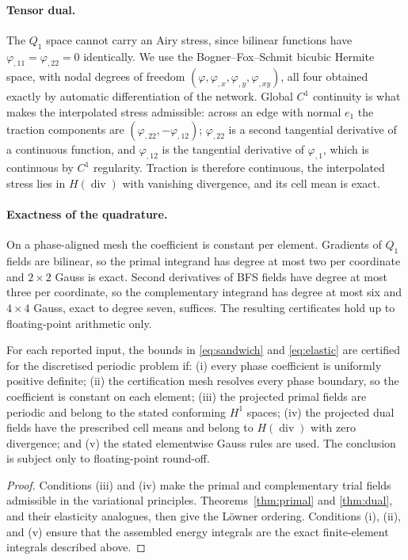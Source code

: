\paragraph{Tensor dual.} The $Q_1$ space cannot carry an Airy stress, since
bilinear functions have $\varphi_{,11} = \varphi_{,22} = 0$ identically. We
use the Bogner--Fox--Schmit bicubic Hermite space, with nodal degrees of
freedom $(\varphi, \varphi_{,x}, \varphi_{,y}, \varphi_{,xy})$, all four
obtained exactly by automatic differentiation of the network. Global $C^1$
continuity is what makes the interpolated stress admissible: across an edge
with normal $e_1$ the traction components are
$(\varphi_{,22}, -\varphi_{,12})$; $\varphi_{,22}$ is a second tangential
derivative of a continuous function, and $\varphi_{,12}$ is the tangential
derivative of $\varphi_{,1}$, which is continuous by $C^1$ regularity.
Traction is therefore continuous, the interpolated stress lies in
$H(\operatorname{div})$ with vanishing divergence, and its cell mean is
exact.

\paragraph{Exactness of the quadrature.} On a phase-aligned mesh the
coefficient is constant per element. Gradients of $Q_1$ fields are
bilinear, so the primal integrand has degree at most two per coordinate and
$2\times 2$ Gauss is exact. Second derivatives of BFS fields have degree at
most three per coordinate, so the complementary integrand has degree at
most six and $4 \times 4$ Gauss, exact to degree seven, suffices. The
resulting certificates hold up to floating-point arithmetic only.

\begin{proposition}
\label{prop:contract}
For each reported input, the bounds in \eqref{eq:sandwich} and
\eqref{eq:elastic} are certified for the discretised periodic problem if:
(i) every phase coefficient is uniformly positive definite; (ii) the
certification mesh resolves every phase boundary, so the coefficient is
constant on each element; (iii) the projected primal fields are periodic
and belong to the stated conforming $H^1$ spaces; (iv) the projected dual
fields have the prescribed cell means and belong to $H(\operatorname{div})$
with zero divergence; and (v) the stated elementwise Gauss rules are used.
The conclusion is subject only to floating-point round-off.
\end{proposition}

\begin{proof}
Conditions (iii) and (iv) make the primal and complementary trial fields
admissible in the variational principles. Theorems~\ref{thm:primal} and
\ref{thm:dual}, and their elasticity analogues, then give the L\"owner
ordering. Conditions (i), (ii), and (v) ensure that the assembled energy
integrals are the exact finite-element integrals described above.
\end{proof}

